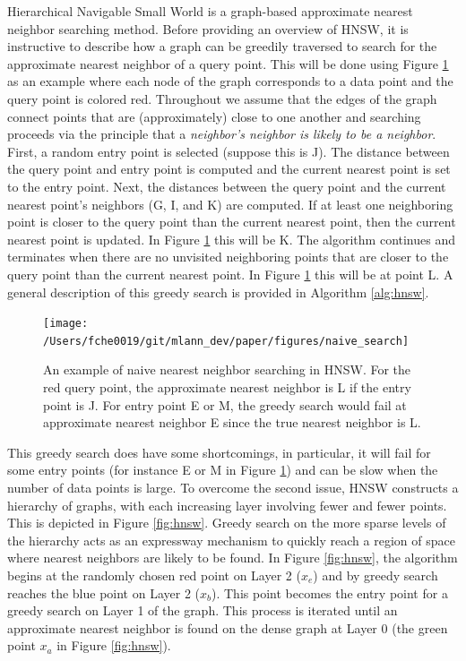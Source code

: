 \documentclass[11pt,a4paper,]{article}
\begin{document}
Hierarchical Navigable Small World \autocite{Malkov2020-jp} is a graph-based approximate nearest neighbor searching method. Before providing an overview of HNSW, it is instructive to describe how a graph can be greedily traversed to search for the approximate nearest neighbor of a query point. This will be done using Figure \ref{fig:naive} as an example where each node of the graph corresponds to a data point and the query point is colored red. Throughout we assume that the edges of the graph connect points that are (approximately) close to one another and searching proceeds via the principle that a \emph{neighbor's neighbor is likely to be a neighbor}. First, a random entry point is selected (suppose this is J). The distance between the query point and entry point is computed and the current nearest point is set to the entry point. Next, the distances between the query point and the current nearest point's neighbors (G, I, and K) are computed. If at least one neighboring point is closer to the query point than the current nearest point, then the current nearest point is updated. In Figure \ref{fig:naive} this will be K. The algorithm continues and terminates when there are no unvisited neighboring points that are closer to the query point than the current nearest point. In Figure \ref{fig:naive} this will be at point L. A general description of this greedy search is provided in Algorithm \ref{alg:hnsw}.

\begin{figure}

{\centering \texttt{[image: /Users/fche0019/git/mlann\_dev/paper/figures/naive\_search]} 

}

\caption{An example of naive nearest neighbor searching in HNSW. For the red query point, the approximate nearest neighbor is L if the entry point is J. For entry point E or M, the greedy search would fail at approximate nearest neighbor E since the true nearest neighbor is L. }\label{fig:naive}
\end{figure}

This greedy search does have some shortcomings, in particular, it will fail for some entry points (for instance E or M in Figure \ref{fig:naive}) and can be slow when the number of data points is large. To overcome the second issue, HNSW constructs a hierarchy of graphs, with each increasing layer involving fewer and fewer points. This is depicted in Figure \ref{fig:hnsw}. Greedy search on the more sparse levels of the hierarchy acts as an expressway mechanism to quickly reach a region of space where nearest neighbors are likely to be found. In Figure \ref{fig:hnsw}, the algorithm begins at the randomly chosen red point on Layer 2 (\(x_e\)) and by greedy search reaches the blue point on Layer 2 (\(x_b\)). This point becomes the entry point for a greedy search on Layer 1 of the graph. This process is iterated until an approximate nearest neighbor is found on the dense graph at Layer 0 (the green point \(x_a\) in Figure \ref{fig:hnsw}).
\end{document}
